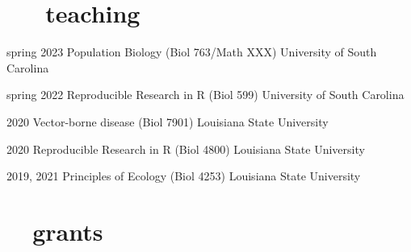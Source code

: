 \documentclass[]{CV}
\begin{document}
\section{ \faInstitution \ \ \ teaching}

\begin{entrylist}

  \entry
    {spring 2023}
		{Population Biology (Biol 763/Math XXX)} %
    {University of South Carolina}


  \entry
    {spring 2022}
		{Reproducible Research in R (Biol 599)}
    {University of South Carolina}

  \entry
    {2020}
		{Vector-borne disease (Biol 7901)}
    {Louisiana State University}

  \entry
    {2020}
		{Reproducible Research in R (Biol 4800)}
    {Louisiana State University}

  \entry
    {2019, 2021}
		{Principles of Ecology (Biol 4253)}
    {Louisiana State University}

\end{entrylist}










\section{\faDollar \ \ grants}
\end{document}
